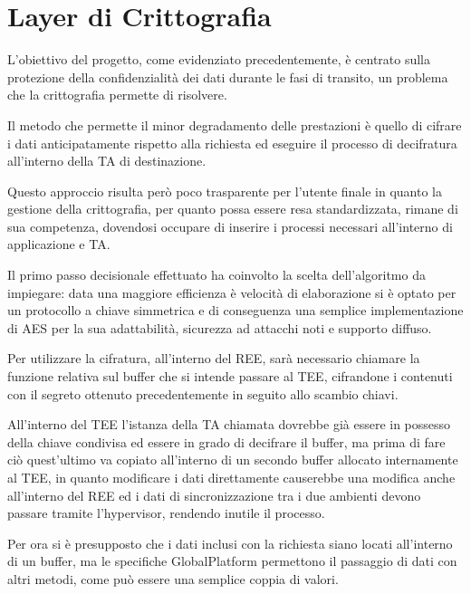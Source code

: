 \documentclass[12pt,italian]{report}
\begin{document}
	\newpage
	
	\section{Layer di Crittografia}
	\label{sec:critt}
	L'obiettivo del progetto, come evidenziato precedentemente, è centrato sulla protezione della confidenzialità dei dati durante le fasi di transito, un problema che la crittografia permette di risolvere. 
	
	\bigbreak
	
	Il metodo che permette il minor degradamento delle prestazioni è quello di cifrare i dati anticipatamente rispetto alla richiesta ed eseguire il processo di decifratura all'interno della TA di destinazione. 
	
	Questo approccio risulta però poco trasparente per l'utente finale in quanto la gestione della crittografia, per quanto possa essere resa standardizzata, rimane di sua competenza, dovendosi occupare di inserire i processi necessari all'interno di applicazione e TA. 
	
	\bigbreak 
	
	Il primo passo decisionale effettuato ha coinvolto la scelta dell'algoritmo da impiegare: data una maggiore efficienza è velocità di elaborazione si è optato per un protocollo a chiave simmetrica e di conseguenza una semplice implementazione di AES \cite{aes} per la sua adattabilità, sicurezza ad attacchi noti e supporto diffuso. 
	
	\bigbreak 
	
	Per utilizzare la cifratura, all'interno del REE, sarà necessario chiamare la funzione relativa sul buffer che si intende passare al TEE, cifrandone i contenuti con il segreto ottenuto precedentemente in seguito allo scambio chiavi.
	
	All'interno del TEE l'istanza della TA chiamata dovrebbe già essere in possesso della chiave condivisa ed essere in grado di decifrare il buffer, ma prima di fare ciò quest'ultimo va copiato all'interno di un secondo buffer allocato internamente al TEE, in quanto modificare i dati direttamente causerebbe una modifica anche all'interno del REE ed i dati di sincronizzazione tra i due ambienti devono passare tramite l'hypervisor, rendendo inutile il processo.
	
	\bigbreak
	
	Per ora si è presupposto che i dati inclusi con la richiesta siano locati all'interno di un buffer, ma le specifiche GlobalPlatform \cite{gp2020clientapi} permettono il passaggio di dati con altri metodi, come può essere una semplice coppia di valori.
	
\end{document}
